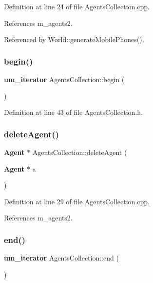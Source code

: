 Definition at line 24 of file Agents\+Collection.\+cpp.



References m\+\_\+agents2.



Referenced by World\+::generate\+Mobile\+Phones().

\mbox{\label{class_agents_collection_abc1d6593a3ed1c1c7b2d31b7efec8db8}} 
\subsubsection{begin()}
{\footnotesize\ttfamily \textbf{ um\+\_\+iterator} Agents\+Collection\+::begin (\begin{DoxyParamCaption}{ }\end{DoxyParamCaption})\hspace{0.3cm}{\ttfamily [inline]}}



Definition at line 43 of file Agents\+Collection.\+h.

\mbox{\label{class_agents_collection_a1bf07bf42e02c317b4b5fe697b9c7dee}} 
\subsubsection{deleteAgent()}
{\footnotesize\ttfamily \textbf{ Agent} $\ast$ Agents\+Collection\+::delete\+Agent (\begin{DoxyParamCaption}\item[{\textbf{ Agent} $\ast$}]{a }\end{DoxyParamCaption})}



Definition at line 29 of file Agents\+Collection.\+cpp.



References m\+\_\+agents2.

\mbox{\label{class_agents_collection_afc61b751cf3387ab4a1bf0dfbc29cb82}} 
\subsubsection{end()}
{\footnotesize\ttfamily \textbf{ um\+\_\+iterator} Agents\+Collection\+::end (\begin{DoxyParamCaption}{ }\end{DoxyParamCaption})\hspace{0.3cm}{\ttfamily [inline]}}



